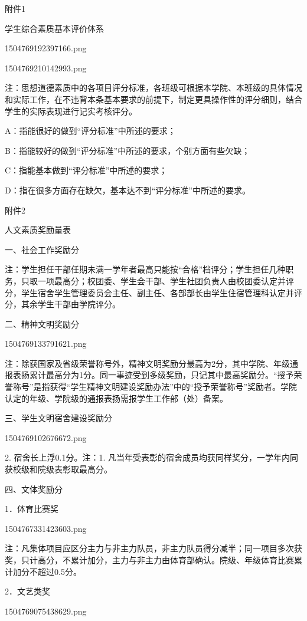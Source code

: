 \documentclass[UTF8,12pt,a4paper]{report}
\begin{document}
 

附件1

  学生综合素质基本评价体系

1504769192397166.png

1504769210142993.png

注：思想道德素质中的各项目评分标准，各班级可根据本学院、本班级的具体情况和实际工作，在不违背本条基本要求的前提下，制定更具操作性的评分细则，结合学生的实际表现进行记实考核评分。 

A：指能很好的做到“评分标准”中所述的要求；

B：指能较好的做到“评分标准”中所述的要求，个别方面有些欠缺；

C：指能基本做到“评分标准”中所述的要求；

D：指在很多方面存在缺欠，基本达不到“评分标准”中所述的要求。


 

附件2

人文素质奖励量表



一、社会工作奖励分



注：学生担任干部任期未满一学年者最高只能按“合格”档评分；学生担任几种职务，只取一项最高分；校团委、学生会干部、学生社团负责人由校团委认定并评分，学生宿舍学生管理委员会主任、副主任、各部部长由学生住宿管理科认定并评分，其余学生干部由学院评分。

二、精神文明奖励分

1504769133791621.png

注：除获国家及省级荣誉称号外，精神文明奖励分最高为2分，其中学院、年级通报表扬累计最高分为1分。同一事迹受到多级奖励，只记其中最高奖励分。“授予荣誉称号”是指获得“学生精神文明建设奖励办法”中的“授予荣誉称号”奖励者。学院认定的年级、学院级的通报表扬需报学生工作部（处）备案。

三、学生文明宿舍建设奖励分

1504769102676672.png

2. 宿舍长上浮0.1分。注：1. 凡当年受表彰的宿舍成员均获同样奖分，一学年内同获校级和院级表彰取最高分。

 

四、文体奖励分

1．体育比赛奖

1504767331423603.png

注：凡集体项目应区分主力与非主力队员，非主力队员得分减半；同一项目多次获奖，只计高分，不累计加分，主力与非主力由体育部确认。院级、年级体育比赛累计加分不超过0.5分。

2．文艺类奖

1504769075438629.png
\end{document}
